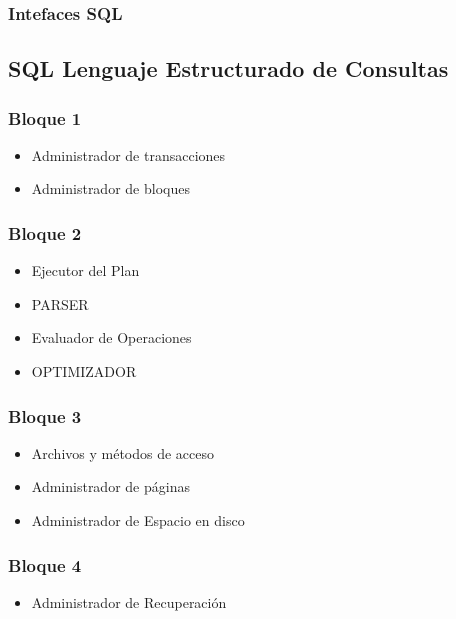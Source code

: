 \documentclass[12pt, fleqn]{report}                             %
\theoremstyle{break}                                            %
\begin{document}
		\subsubsection{Intefaces SQL}

	\subsection{SQL Lenguaje Estructurado de Consultas}

		\subsubsection{Bloque 1}
		\begin{itemize}
			\item Administrador de transacciones
			\item Administrador de bloques
		\end{itemize}

		\subsubsection{Bloque 2}
		\begin{itemize}
			\item Ejecutor del Plan
			\item PARSER
			\item Evaluador de Operaciones
			\item OPTIMIZADOR
		\end{itemize}

		\subsubsection{Bloque 3}
		\begin{itemize}
			\item Archivos y métodos de acceso
			\item Administrador de páginas
			\item Administrador de Espacio en disco
		\end{itemize}

		\subsubsection{Bloque 4}
		\begin{itemize}
			\item Administrador de Recuperación
			
		\end{itemize}
\end{document}
